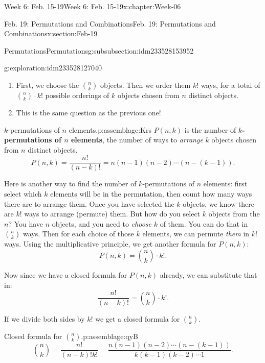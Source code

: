 \documentclass[oneside,10pt,]{book}
\newcommand{\terminology}[1]{\textbf{#1}}
\numberwithin{equation}{section}
\begin{document}
\begin{chapterptx}{Week 6: Feb. 15-19}{}{Week 6: Feb. 15-19}{}{}{x:chapter:Week-06}
\begin{sectionptx}{Feb. 19: Permutations and Combinations}{}{Feb. 19: Permutations and Combinations}{}{}{x:section:Feb-19}
\begin{subsubsectionptx}{Permutations}{}{Permutations}{}{}{g:subsubsection:idm233528153952}
\begin{exploration}{}{g:exploration:idm233528127040}
\begin{enumerate}
\item{}First, we choose the \(\binom{n}{k}\) objects. Then we order them \(k!\) ways, for a total of \(\binom{n}{k}\cdot k!\) possible orderings of \(k\) objects chosen from \(n\) distinct objects.%
\item{}This is the same question as the previous one!%
\end{enumerate}
\end{exploration}%
\begin{assemblage}{\(k\)-permutations of \(n\) elements.}{p:assemblage:Krs}%
\(P(n,k)\) is the number of \terminology{\(k\)-permutations of \(n\) elements}, the number of ways to \emph{arrange} \(k\) objects chosen from \(n\) distinct objects.%
\begin{equation*}
P(n,k) = \frac{n!}{(n-k)!} = n(n-1)(n-2)\cdots (n-(k-1))\text{.}
\end{equation*}
%
\end{assemblage}
Here is another way to find the number of \(k\)-permutations of \(n\) elements: first select which \(k\) elements will be in the permutation, then count how many ways there are to arrange them. Once you have selected the \(k\) objects, we know there are \(k!\) ways to arrange (permute) them. But how do you select \(k\) objects from the \(n\)? You have \(n\) objects, and you need to \emph{choose} \(k\) of them. You can do that in \({n \choose k}\) ways. Then for each choice of those \(k\) elements, we can permute \emph{them} in \(k!\) ways. Using the multiplicative principle, we get another formula for \(P(n,k)\):%
\begin{equation*}
P(n,k) = {n \choose k}\cdot k!\text{.}
\end{equation*}
%
\par
Now since we have a closed formula for \(P(n,k)\) already, we can substitute that in:%
\begin{equation*}
\frac{n!}{(n-k)!} = {n \choose k} \cdot k!\text{.}
\end{equation*}
%
\par
If we divide both sides by \(k!\) we get a closed formula for \({n \choose k}\).%
\begin{assemblage}{Closed formula for \({n \choose k}\).}{p:assemblage:qyB}%
%
\begin{equation*}
{n \choose k} = \frac{n!}{(n-k)!k!} = \frac{n(n-1)(n-2)\cdots(n-(k-1))}{k(k-1)(k-2)\cdots 1}\text{.}
\end{equation*}
%
\end{assemblage}

\end{subsubsectionptx}
\end{sectionptx}
\end{chapterptx}
\end{document}
